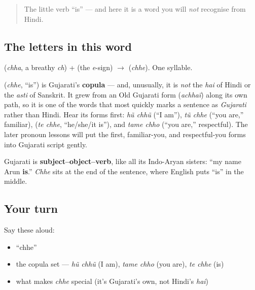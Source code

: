 \label{lesson:GU-C02-chhe}



\begin{quote}
The little verb \textquotedblleft{}is\textquotedblright{} — and here it is a word you will \emph{not} recognise from Hindi.
\end{quote}

\subsection*{The letters in this word}
\textbf{} (\emph{chha}, a breathy \emph{ch}) + \textbf{} (the \emph{e}-sign) $\to$ \textbf{} (\emph{chhe}). One syllable.

\begin{cousinweb}
\textbf{} (\emph{chhe}, \textquotedblleft{}is\textquotedblright{}) is Gujarati's \textbf{copula} — and, unusually, it is \emph{not} the \emph{hai} of Hindi or the \emph{asti} of Sanskrit. It grew from an Old Gujarati form (\emph{achhaï}) along its own path, so it is one of the words that most quickly marks a sentence as \emph{Gujarati} rather than Hindi. Hear its forms first: \emph{hũ chhũ} (\textquotedblleft{}I am\textquotedblright{}), \emph{tũ chhe} (\textquotedblleft{}you are,\textquotedblright{} familiar), \textbf{ } (\emph{te chhe}, \textquotedblleft{}he/she/it is\textquotedblright{}), and \emph{tame chho} (\textquotedblleft{}you are,\textquotedblright{} respectful). The later pronoun lessons will put the first, familiar-you, and respectful-you forms into Gujarati script gently.
\end{cousinweb}

\begin{grammarlens}[title={Grammar Lens: the verb goes last}]
Gujarati is \textbf{subject–object–verb}, like all its Indo-Aryan sisters: \textquotedblleft{}my name Arun \textbf{is}.\textquotedblright{} \emph{Chhe} sits at the end of the sentence, where English puts \textquotedblleft{}is\textquotedblright{} in the middle.
\end{grammarlens}

\subsection*{Your turn}
Say these aloud:

\begin{itemize}
\raggedright
  \item \textquotedblleft{}chhe\textquotedblright{}
  \item the copula set — \emph{hũ chhũ} (I am), \emph{tame chho} (you are), \emph{te chhe} (is)
  \item what makes \emph{chhe} special (it's Gujarati's own, not Hindi's \emph{hai})
\end{itemize}

